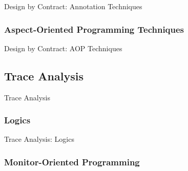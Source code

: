\documentclass[12pt]{beamer}
\begin{document}
\begin{frame}{Design by Contract: Annotation Techniques}
\end{frame}

\subsubsection{Aspect-Oriented Programming Techniques}
\label{sec:runver-sbc-aop}

\begin{frame}{Design by Contract: AOP Techniques}

\end{frame}


\subsection{Trace Analysis}
\label{sec:runver-trace}

\begin{frame}{Trace Analysis}

\end{frame}

\subsubsection{Logics}
\label{sec:runver-trace-log}

\begin{frame}{Trace Analysis: Logics}

\end{frame}

\subsubsection{Monitor-Oriented Programming}
\label{sec:runver-trace-mop}
\end{document}
